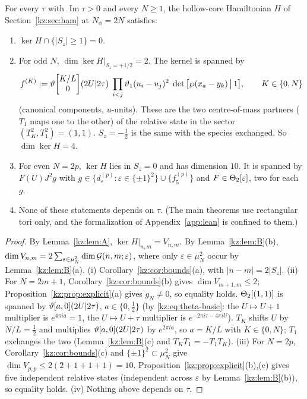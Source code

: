 \begin{theorem}[the zero modes on the torus at $N_\phi=2N$]\label{kz:thm:T2}
For every $\tau$ with $\operatorname{Im}\tau>0$ and every $N\ge1$, the hollow-core Hamiltonian $H$ of Section~\ref{kz:sec:ham} at
$N_\phi=2N$ satisfies:
\begin{enumerate}
\item[(i)] $\ker H\cap\{|S_z|\ge1\}=0$.
\item[(ii)] For odd $N$, $\dim\ker H|_{S_z=+1/2}=2$. The kernel is spanned by
\[
f^{(K)}:=\vartheta\!\begin{bmatrix}K/L\\0\end{bmatrix}\!(2U|2\tau)\;\prod_{i<j}\vartheta_1(u_i-u_j)^2\;
\det\big[\wp(x_a-y_k)\,\big|\,1\big],\qquad K\in\{0,N\}
\]
(canonical components, $u$-units). These are the two centre-of-mass partners ($T_1$ maps one to the
other) of the relative state in the sector $(T_K^2,T_1^2)=(1,1)$. $S_z=-\tfrac12$ is the same with the
species exchanged. So $\dim\ker H=4$.
\item[(iii)] For even $N=2p$, $\ker H$ lies in $S_z=0$ and has dimension $10$.
It is spanned by $F(U)J^2g$ with $g\in\{d^{(p)}_\varepsilon:\varepsilon\in\{\pm1\}^2\}\cup\{f_5^{(p)}\}$ and
$F\in\Theta_2[\varepsilon]$, two for each $g$.
\item[(iv)] None of these statements depends on $\tau$. (The main theorems use rectangular tori only, and the
formalization of Appendix~\ref{app:lean} is confined to them.)
\end{enumerate}
\end{theorem}

\begin{proof}
By Lemma~\ref{kz:lem:A}, $\ker H|_{n,m}=V_{n,m}$. By Lemma~\ref{kz:lem:B}(b),
$\dim V_{n,m}=2\sum_{\varepsilon\in\mu_N^2}\dim\mathcal{G}(n,m;\varepsilon)$, where only $\varepsilon\in\mu_N^2$ occur by
Lemma~\ref{kz:lem:B}(a).
(i) Corollary~\ref{kz:cor:bounds}(a), with $|n-m|=2|S_z|$.
(ii) For $N=2m+1$, Corollary~\ref{kz:cor:bounds}(b) gives $\dim V_{m+1,m}\le2$; Proposition~\ref{kz:prop:explicit}(a)
gives $g_N\neq0$, so equality holds. $\Theta_2[(1,1)]$ is spanned by $\vartheta[a,0](2U|2\tau)$, $a\in\{0,\tfrac12\}$
(by \eqref{kz:eq:theta-basic}: the $U\mapsto U+1$ multiplier is $e^{4\pi ia}=1$, the $U\mapsto U+\tau$ multiplier
is $e^{-2\pi i\tau-4\pi iU}$). $T_K$ shifts $U$ by $N/L=\tfrac12$ and multiplies $\vartheta[a,0](2U|2\tau)$ by
$e^{2\pi ia}$, so $a=K/L$ with $K\in\{0,N\}$; $T_1$ exchanges the two (Lemma~\ref{kz:lem:B}(c) and
$T_KT_1=-T_1T_K$).
(iii) For $N=2p$, Corollary~\ref{kz:cor:bounds}(c) and $\{\pm1\}^2\subset\mu_N^2$ give
$\dim V_{p,p}\le2(2+1+1+1)=10$. Proposition~\ref{kz:prop:explicit}(b),(c) gives five independent relative states
(independent across $\varepsilon$ by Lemma~\ref{kz:lem:B}(b)), so equality holds.
(iv) Nothing above depends on $\tau$.
\end{proof}

